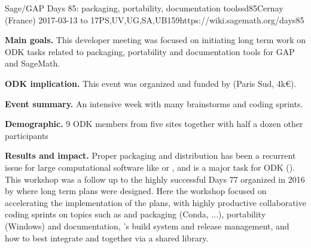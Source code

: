 \begin{event}{Sage/GAP Days 85: packaging, portability, documentation tools}{sd85}{Cernay (France) 2017-03-13 to 17}{PS,UV,UG,SA,UB}{15}{9}{https://wiki.sagemath.org/days85}

  \textbf{Main goals.} This developer meeting was focused on
  initiating long term work on ODK tasks related to packaging,
  portability and documentation tools for GAP and SageMath.

  \textbf{ODK implication.} This event was organized and funded by
  \ODK (Paris Sud, \approx 4k€).

  \textbf{Event summary.} An intensive week with many brainstorms and coding sprints.

  \textbf{Demographic.} 9 ODK members from five sites together with
  half a dozen other participants

  \textbf{Results and impact.} Proper packaging and distribution has
  been a recurrent issue for large computational software like \Sage
  or \GAP, and is a major task for ODK
  (). This workshop
  was a follow up to the highly successful \Sage Days 77 organized in
  2016 by \ODK where long term plans were designed. Here the workshop
  focused on accelerating the implementation of the plans, with highly
  productive collaborative coding sprints on topics such as \GAP and
  \Sage packaging (Conda, ...), \Sage portability (Windows) and
  documentation, \GAP's build system and release management, and how
  to best integrate \GAP and \Sage together via a shared library.
\end{event}
